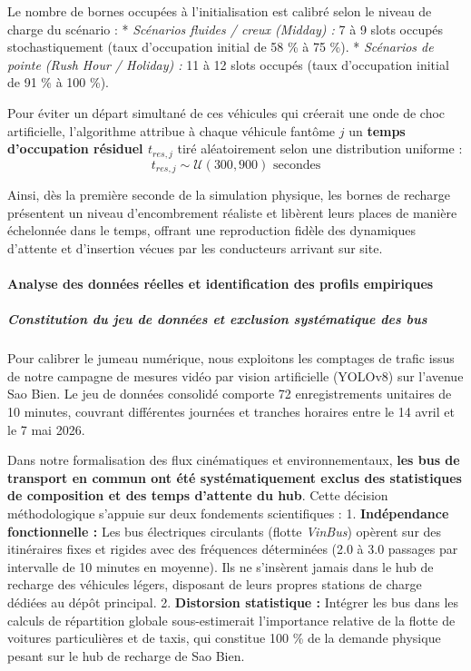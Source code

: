 \documentclass[10pt, a4paper]{article}
\begin{document}
Le nombre de bornes occupées à l'initialisation est calibré selon le
niveau de charge du scénario : * \emph{Scénarios fluides / creux
(Midday) :} 7 à 9 slots occupés stochastiquement (taux d'occupation
initial de 58 \% à 75 \%). * \emph{Scénarios de pointe (Rush Hour /
Holiday) :} 11 à 12 slots occupés (taux d'occupation initial de 91 \% à
100 \%).

Pour éviter un départ simultané de ces véhicules qui créerait une onde
de choc artificielle, l'algorithme attribue à chaque véhicule fantôme
\(j\) un \textbf{temps d'occupation résiduel \(t_{res, j}\)} tiré
aléatoirement selon une distribution uniforme :
\[t_{res, j} \sim \mathcal{U}(300, 900) \text{ secondes}\]

Ainsi, dès la première seconde de la simulation physique, les bornes de
recharge présentent un niveau d'encombrement réaliste et libèrent leurs
places de manière échelonnée dans le temps, offrant une reproduction
fidèle des dynamiques d'attente et d'insertion vécues par les
conducteurs arrivant sur site.

\paragraph{Analyse des données réelles et identification des profils
empiriques}\label{analyse-des-donnuxe9es-ruxe9elles-et-identification-des-profils-empiriques}

\subparagraph{Constitution du jeu de données et exclusion systématique
des
bus}\label{constitution-du-jeu-de-donnuxe9es-et-exclusion-systuxe9matique-des-bus}

Pour calibrer le jumeau numérique, nous exploitons les comptages de
trafic issus de notre campagne de mesures vidéo par vision artificielle
(YOLOv8) sur l'avenue Sao Bien. Le jeu de données consolidé comporte 72
enregistrements unitaires de 10 minutes, couvrant différentes journées
et tranches horaires entre le 14 avril et le 7 mai 2026.

Dans notre formalisation des flux cinématiques et environnementaux,
\textbf{les bus de transport en commun ont été systématiquement exclus
des statistiques de composition et des temps d'attente du hub}. Cette
décision méthodologique s'appuie sur deux fondements scientifiques : 1.
\textbf{Indépendance fonctionnelle :} Les bus électriques circulants
(flotte \emph{VinBus}) opèrent sur des itinéraires fixes et rigides avec
des fréquences déterminées (2.0 à 3.0 passages par intervalle de 10
minutes en moyenne). Ils ne s'insèrent jamais dans le hub de recharge
des véhicules légers, disposant de leurs propres stations de charge
dédiées au dépôt principal. 2. \textbf{Distorsion statistique :}
Intégrer les bus dans les calculs de répartition globale sous-estimerait
l'importance relative de la flotte de voitures particulières et de
taxis, qui constitue 100 \% de la demande physique pesant sur le hub de
recharge de Sao Bien.
\end{document}

